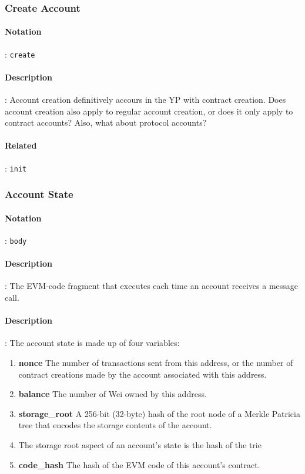 \documentclass[10pt,a4paper,leqno,bibliography=totoc]{scrartcl}
\newenvironment{alphafootnotes}
{\par\edef\savedfootnotenumber{\number\value{footnote}}
\renewcommand{\thefootnote}{\alph{footnote}}
\setcounter{footnote}{0}}
{\par\setcounter{footnote}{\savedfootnotenumber}}
\begin{document}
\begin{alphafootnotes}
\begin{multicols*}{2}
			\subsubsection{Create Account}
				\paragraph{Notation}: \texttt{create}
				\paragraph{Description}: Account creation definitively accours in the YP with contract creation. Does account creation also apply to regular account creation, or does it only apply to contract accounts? Also, what about protocol accounts?
				\paragraph{Related}: \texttt{init}
			\subsubsection{Account State}
				\paragraph{Notation}: \texttt{body}
				\paragraph{Description}: The EVM-code fragment that executes each time an account receives a message call. 

				\paragraph{Description}: The account state is made up of four variables:
				\begin{enumerate}
					\item \textbf{nonce} The number of transactions sent from this address, or the number of contract creations made by the account associated with this address.
					\item \textbf{balance} The number of Wei owned by this address.
					\item \textbf{storage\_root} A 256-bit (32-byte) hash of the root node of a Merkle Patricia tree that encodes the storage contents of the account.
					\item The storage root aspect of an account’s state is the hash of the trie
					\item \textbf{code\_hash} The hash of the EVM code of this account's contract.
				\end{enumerate}


\end{multicols*}
\end{alphafootnotes}
\end{document}
